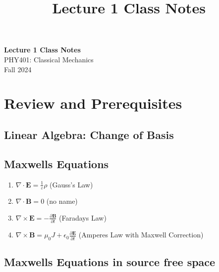 \documentclass[11pt]{article}
\theoremstyle{definition}
\begin{document}
\setcounter{section}{0}
\title{Lecture 1 Class Notes}

\thispagestyle{empty}

\begin{center}
{\LARGE \bf Lecture 1 Class Notes}\\
{\large PHY401: Classical Mechanics}\\
Fall 2024
\end{center}


\tableofcontents


\section{Review and Prerequisites}
\subsection{Linear Algebra: Change of Basis}

\subsection{Maxwells Equations}

\begin{shaded}
\renewcommand{\labelenumi}{\alph{enumi})}
\begin{enumerate}
\item $\nabla \cdot \textbf{E} = \frac{1}{\varepsilon} \rho$ (Gauss's Law) \newline
\item $\nabla \cdot \textbf{B} = 0$ (no name) \newline
\item $\nabla \times \textbf{E} = -\frac{\partial \textbf{B}}{\partial t}$ (Faradays Law) \newline
\item $\nabla \times \textbf{B} = \mu_0 J + \epsilon_0 \frac{\partial \textbf{E}}{\partial t}$ (Amperes Law with Maxwell Correction) \newline
\end{enumerate}
\end{shaded}

\subsection{Maxwells Equations in source free space}    
\end{document}
